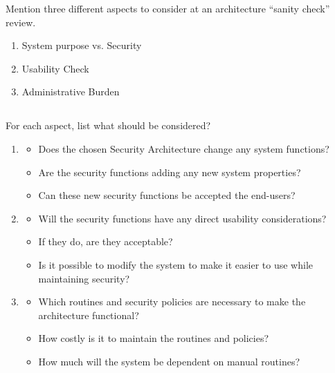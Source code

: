\begin{questions}
\question{} Mention three different aspects to consider at an architecture ``sanity check'' review.
  \begin{solution}
    \begin{enumerate}[noitemsep]
    \item System purpose vs. Security
    \item Usability Check
    \item Administrative Burden
    \end{enumerate}
  \end{solution}

  \begin{parts}
  \part{} For each aspect, list what should be considered?
    \begin{solution}
      \begin{enumerate}[noitemsep]
      \item
        \begin{itemize}[noitemsep]
        \item Does the chosen Security Architecture change any system functions?
        \item Are the security functions adding any new system properties?
        \item Can these new security functions be accepted the end-users?
        \end{itemize}
      \item
        \begin{itemize}[noitemsep]
        \item Will the security functions have any direct usability considerations?
        \item If they do, are they acceptable?
        \item Is it possible to modify the system to make it easier to use while maintaining security?
        \end{itemize}
      \item
        \begin{itemize}[noitemsep]
        \item Which routines and security policies are necessary to make the architecture functional?
        \item How costly is it to maintain the routines and policies?
        \item How much will the system be dependent on manual routines?
        \end{itemize}
      \end{enumerate}
    \end{solution}
  \end{parts}


\end{questions}
